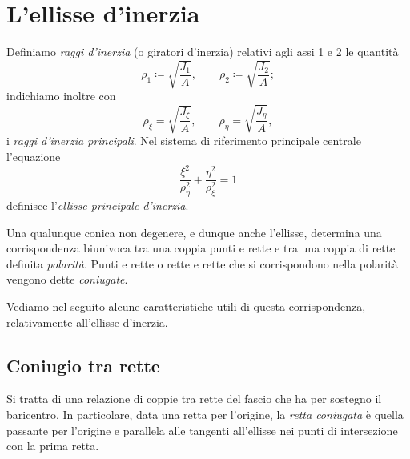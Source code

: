 \section{L'ellisse d'inerzia}
Definiamo \textit{raggi d'inerzia} (o giratori d'inerzia) relativi agli assi 1 e 2  le quantità
\begin{equation}
\rho_1\coloneqq \sqrt{\frac{J_1}{A}}, \qquad \rho_2\coloneqq \sqrt{\frac{J_2}{A}};
\end{equation}
indichiamo inoltre con
\begin{equation}
\rho_\xi =\sqrt{\frac{J_\xi}{A}}, \qquad \rho_\eta =\sqrt{\frac{J_\eta}{A}},
\end{equation}
i \textit{raggi d'inerzia principali}. Nel sistema di riferimento principale centrale l'equazione
\begin{equation}
	\frac{\xi^2}{\rho_\eta^2}+\frac{\eta^2}{\rho_\xi^2}=1
\end{equation}
definisce l'\textit{ellisse principale d'inerzia}. 


%

Una qualunque conica non degenere, e dunque anche l'ellisse, determina una corrispondenza biunivoca tra una coppia punti e rette e tra una coppia di rette  definita \textit{polarità}. Punti e rette o rette e rette che si corrispondono nella polarità vengono dette \textit{coniugate}.

Vediamo nel seguito alcune caratteristiche utili di questa corrispondenza, relativamente all'ellisse d'inerzia.

\subsection{Coniugio tra rette}
Si tratta di una relazione di coppie tra rette del fascio che ha per sostegno il baricentro. In particolare, data una retta per l'origine,  la \textit{retta coniugata } è quella passante per l'origine e parallela alle tangenti all'ellisse nei punti di intersezione con la prima retta.

